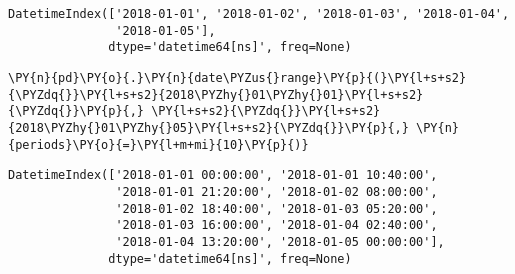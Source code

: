             \begin{tcolorbox}[breakable, size=fbox, boxrule=.5pt, pad at break*=1mm, opacityfill=0]
\begin{Verbatim}[commandchars=\\\{\}]
DatetimeIndex(['2018-01-01', '2018-01-02', '2018-01-03', '2018-01-04',
               '2018-01-05'],
              dtype='datetime64[ns]', freq=None)
\end{Verbatim}
\end{tcolorbox}
        
    \begin{tcolorbox}[breakable, size=fbox, boxrule=1pt, pad at break*=1mm,colback=cellbackground, colframe=cellborder]
\begin{Verbatim}[commandchars=\\\{\}]
\PY{n}{pd}\PY{o}{.}\PY{n}{date\PYZus{}range}\PY{p}{(}\PY{l+s+s2}{\PYZdq{}}\PY{l+s+s2}{2018\PYZhy{}01\PYZhy{}01}\PY{l+s+s2}{\PYZdq{}}\PY{p}{,} \PY{l+s+s2}{\PYZdq{}}\PY{l+s+s2}{2018\PYZhy{}01\PYZhy{}05}\PY{l+s+s2}{\PYZdq{}}\PY{p}{,} \PY{n}{periods}\PY{o}{=}\PY{l+m+mi}{10}\PY{p}{)}
\end{Verbatim}
\end{tcolorbox}

            \begin{tcolorbox}[breakable, size=fbox, boxrule=.5pt, pad at break*=1mm, opacityfill=0]
\begin{Verbatim}[commandchars=\\\{\}]
DatetimeIndex(['2018-01-01 00:00:00', '2018-01-01 10:40:00',
               '2018-01-01 21:20:00', '2018-01-02 08:00:00',
               '2018-01-02 18:40:00', '2018-01-03 05:20:00',
               '2018-01-03 16:00:00', '2018-01-04 02:40:00',
               '2018-01-04 13:20:00', '2018-01-05 00:00:00'],
              dtype='datetime64[ns]', freq=None)
\end{Verbatim}
\end{tcolorbox}

